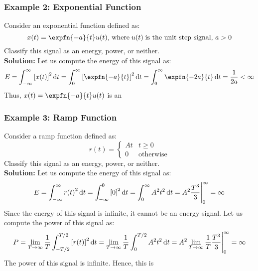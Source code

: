 \documentclass[../notes-main.tex]{subfiles}
\begin{document}
\subsubsection{Example 2: Exponential Function}
Consider an exponential function defined as:
\begin{equation}
    x(t) = \expfn{-a}{t}u(t), \, \text{where} \; u(t) \;\text{is the unit step signal},\, a > 0
    \label{eq:exp-function-example}
\end{equation}
Classify this signal as an energy, power, or neither.\\
\noindent \textbf{Solution:} Let us compute the energy of this signal as:
\begin{equation}
    E = \int_{-\infty}^{\infty} {[x(t)]}^2 \dif t = \int_{0}^{\infty} {[\expfn{-a}{t}]}^2 \dif t = \int_{0}^{\infty} \expfn{-2a}{t} \dif t = \frac{1}{2a} < \infty
    \label{eq:exp-function-energy}
\end{equation}
Thus, \(x(t) = \expfn{-a}{t} u(t)\) is an 

\subsubsection{Example 3: Ramp Function}
Consider a ramp function defined as:
\begin{equation}
    r(t) =
    \begin{cases}
        At & t \geq 0         \\
        0  & \text{otherwise}
    \end{cases}
    \label{eq:ramp-function-example}
\end{equation}
Classify this signal as an energy, power, or neither.\\
\noindent \textbf{Solution:} Let us compute the energy of this signal as:
\begin{equation}
    E = \int_{-\infty}^{\infty} {r(t)}^2 \dif t = \int_{-\infty}^{0} {[0]}^2 \dif t = \int_{0}^{\infty} A^2 t^2 \dif t = A^2 \frac{T^3}{3} \Bigg|_{0}^{\infty} = \infty
    \label{eq:ramp-function-energy}
\end{equation}
Since the energy of this signal is infinite, it cannot be an energy signal. Let us compute the power of this signal as:
\begin{equation}
    P = \lim_{T \to \infty} \frac{1}{T} \int_{-T/2}^{T/2} {[r(t)]}^2 \dif t = \lim_{T \to \infty} \frac{1}{T} \int_{0}^{T/2} A^2 t^2 \dif t = A^2 \lim_{T \to \infty} \frac{1}{T} \frac{T^3}{3} \Bigg|_{0}^{\infty} = \infty
    \label{eq:ramp-function-power}
\end{equation}
The power of this signal is infinite. Hence, this is 
\end{document}
